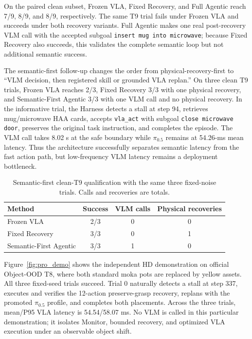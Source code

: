 \documentclass[runningheads]{waica}
\newcommand{\pizero}{$\pi_{0.5}$}
\begin{document}
On the paired clean subset, Frozen VLA, Fixed Recovery, and Full Agentic reach
7/9, 8/9, and 8/9, respectively. The same T9 trial fails under Frozen VLA and
succeeds under both recovery variants. Full Agentic makes one real
post-recovery VLM call with the accepted subgoal \texttt{insert mug into
microwave}; because Fixed Recovery also succeeds, this validates the complete
semantic loop but not additional semantic success.

The semantic-first follow-up changes the order from physical-recovery-first to
``VLM decision, then registered skill or grounded VLA replan.'' On three clean
T9 trials, Frozen VLA reaches 2/3, Fixed Recovery 3/3 with one physical
recovery, and Semantic-First Agentic 3/3 with one VLM call and no physical
recovery. In the informative trial, the Harness detects a stall at step 94,
retrieves mug/microwave HAA cards, accepts \texttt{vla\_act} with subgoal
\texttt{close microwave door}, preserves the original task instruction, and
completes the episode. The VLM call takes 8.02 s at the safe boundary while
\pizero{} remains at 54.26-ms mean latency. Thus the architecture successfully
separates semantic latency from the fast action path, but low-frequency VLM
latency remains a deployment bottleneck.

\begin{table}
\caption{Semantic-first clean-T9 qualification with the same three fixed-noise
trials. Calls and recoveries are totals.}
\label{tab:pro_semantic}
\centering
\small
\begin{tabular}{lccc}
\toprule
Method & Success & VLM calls & Physical recoveries \\
\midrule
Frozen VLA & 2/3 & 0 & 0 \\
Fixed Recovery & 3/3 & 0 & 1 \\
Semantic-First Agentic & 3/3 & 1 & 0 \\
\bottomrule
\end{tabular}
\end{table}

Figure~\ref{fig:pro_demo} shows the independent HD demonstration on official
Object-OOD T8, where both standard moka pots are replaced by
yellow assets. All three fixed-seed trials succeed. Trial 0 naturally detects a
stall at step 337, executes and verifies the 12-action preserve-grasp recovery,
replans with the promoted \pizero{} profile, and completes both placements.
Across the three trials, mean/P95 VLA latency is 54.54/58.07 ms. No VLM is
called in this particular demonstration; it isolates Monitor, bounded recovery,
and optimized VLA execution under an observable object shift.
\end{document}
